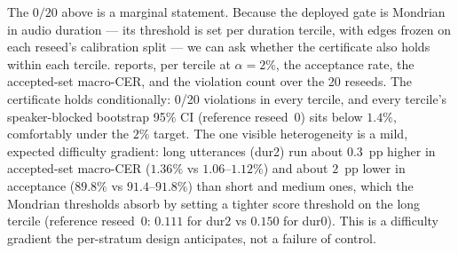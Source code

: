 \documentclass[11pt]{article}
\begin{document}
The $0/20$ above is a marginal statement. Because the deployed gate is Mondrian in
audio duration --- its threshold is set per duration tercile, with edges frozen on each
reseed's calibration split --- we can ask whether the certificate also holds within
each tercile.  reports, per tercile at $\alpha=2\%$, the acceptance rate,
the accepted-set macro-CER, and the violation count over the 20 reseeds. The certificate
holds conditionally: 0/20 violations in every tercile, and every tercile's
speaker-blocked bootstrap 95\% CI (reference reseed~0) sits below $1.4\%$, comfortably under
the $2\%$ target. The one visible heterogeneity is a mild, expected difficulty gradient: long
utterances (dur2) run about $0.3$~pp higher in accepted-set macro-CER ($1.36\%$ vs
$1.06$--$1.12\%$) and about $2$~pp lower in acceptance ($89.8\%$ vs $91.4$--$91.8\%$) than
short and medium ones, which the Mondrian thresholds absorb by setting a tighter score
threshold on the long tercile (reference reseed~0: $0.111$ for dur2 vs $0.150$ for dur0). This
is a difficulty gradient the per-stratum design anticipates, not a failure of control.
\end{document}
